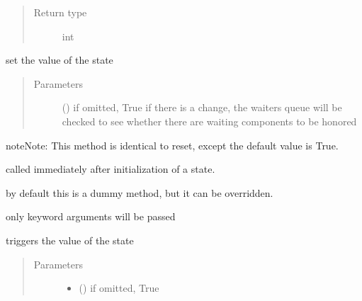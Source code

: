 \documentclass[letterpaper,10pt,english]{sphinxmanual}
\begin{document}
\begin{fulllineitems}
\begin{fulllineitems}
\begin{quote}
\begin{description}
\item[{Return type}] \leavevmode
int

\end{description}\end{quote}

\end{fulllineitems}


\begin{fulllineitems}
\label{\detokenize{Reference:salabim.State.set}}
set the value of the state
\begin{quote}\begin{description}
\item[{Parameters}] \leavevmode
{} (\sphinxstyleliteralemphasis{ (}\sphinxstyleliteralemphasis{)}) \textendash{} if omitted, True 
if there is a change, the waiters queue will be checked
to see whether there are waiting components to be honored

\end{description}\end{quote}

\begin{sphinxadmonition}{note}{Note:}
This method is identical to reset, except the default value is True.
\end{sphinxadmonition}

\end{fulllineitems}


\begin{fulllineitems}
\label{\detokenize{Reference:salabim.State.setup}}
called immediately after initialization of a state.

by default this is a dummy method, but it can be overridden.

only keyword arguments will be passed

\end{fulllineitems}


\begin{fulllineitems}
\label{\detokenize{Reference:salabim.State.trigger}}
triggers the value of the state
\begin{quote}\begin{description}
\item[{Parameters}] \leavevmode\begin{itemize}
\item {} 
 (\sphinxstyleliteralemphasis{ (}\sphinxstyleliteralemphasis{)}) \textendash{} if omitted, True 


\end{itemize}
\end{description}
\end{quote}
\end{fulllineitems}
\end{fulllineitems}
\end{document}
